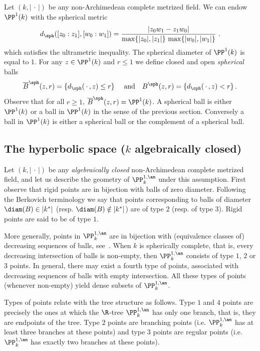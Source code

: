 Let $(k,|{\,\cdot\,}|)$ be any non-Archimedean complete metrized field. We can endow $\PP^1(k)$ with the spherical metric
\begin{equation}\label{eq:dsph}
d_{\sph} ([z_0:z_1], [w_0:w_1]) = \frac{|z_0w_1 - z_1w_0|}{\max\{ |z_0|, |z_1|\} \, \max\{ |w_0|, |w_1|\}}~.
\end{equation}
which satisfies the ultrametric inequality. The spherical diameter of $\PP^1(k)$ is equal to $1$. For any $z\in \PP^1(k)$ and $r\le 1$ we define closed and open \emph{spherical} balls
\[
\overline{B}^{\sph}(z,r) = \{ d_{\sph} ({\,\cdot\,}, z) \le r\} \quad\text{ and}\quad B^{\sph}(z,r) = \{ d_{\sph} ({\,\cdot\,}, z) < r\}\,.
\]
Observe that for all $r\ge1$, $\overline{B}^{\sph}(z,r) = \PP^1(k)$. A spherical ball is either $\PP^1(k)$ or a ball in $\PP^1(k)$ in the sense of the previous section. Conversely a ball in $\PP^1(k)$ is either a spherical ball or the complement of a spherical ball.

\subsection{The hyperbolic space (\texorpdfstring{$k$}{k} algebraically closed)} \label{subs:hyperbolic alg closed}

Let $(k,|{\,\cdot\,}|)$ be any \emph{algebraically closed} non-Archimedean complete metrized field, and let us describe the geometry of $\PP^{1,\an}_k$ under this assumption. First observe that rigid points are in bijection with balls of zero diameter. Following the Berkovich terminology we say that points corresponding to balls of diameter $\diam(B) \in |k^*|$ (resp. $\diam(B) \notin |k^*|$) are of type $2$ (resp. of type $3$). Rigid points are said to be of type $1$.

More generally, points in $\PP^{1,\an}_k$ are in bijection with (equivalence classes of) decreasing sequences of balls, see~\cite[Thm.~1.2]{baker-rumely}. When $k$ is spherically complete, that is, every decreasing intersection of balls is non-empty, then $\PP^{1,\an}_k$ consists of type $1$, $2$ or $3$ points. In general, there may exist a fourth type of points, associated with decreasing sequences of balls with empty intersection. All these types of points (whenever non-empty) yield dense subsets of $\PP^{1,\an}_k$.

Types of points relate with the tree structure as follows. Type $1$ and $4$ points are precisely the ones at which the $\R$-tree $\PP^{1,\an}_k$ has only one branch, that is, they are endpoints of the tree. Type $2$ points are branching points (i.e. $\PP^{1,\an}_k$ has at least three branches at these points) and type $3$ points are regular points (i.e. $\PP^{1,\an}_k$ has exactly two branches at these points).

